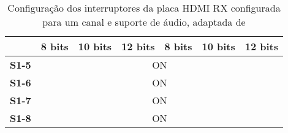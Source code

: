 \begin{table}[h!]
\begin{tabular}{|c|c|c|c|c|c|c|}
		& 8 bits                                                    & 10 bits                                                   & 12 bits                                                   & 8 bits & 10 bits & 12 bits \\ \hline
		\textbf{S1-5}                    & \multicolumn{6}{c|}{ON}                                                                                                                                                                                        \\ \hline
		\textbf{S1-6}                    & \multicolumn{6}{c|}{ON}                                                                                                                                                                                        \\ \hline
		\textbf{S1-7}                    & \multicolumn{6}{c|}{ON}                                                                                                                                                                                        \\ \hline
		\textbf{S1-8}                    & \multicolumn{6}{c|}{ON}                                                                                                                                                                                        \\ \hline
	\end{tabular}
	\caption{Configuração dos interruptores da placa HDMI RX configurada para um canal e suporte de áudio, adaptada de \cite{R014}}
	\label{table:HDMI_1ch+audio_switches_RX}
\end{table}

